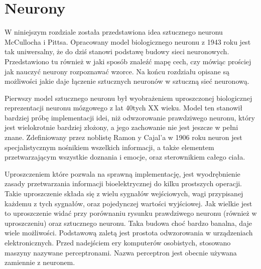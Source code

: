 \documentclass[12pt,a4paper,twoside,titlepage,openright]{book}
\begin{document}
\chapter{Neurony}
W niniejszym rozdziale została przedstawiona idea sztucznego neuronu McCullocha i Pittsa. Opracowany model biologicznego neuronu z 1943 roku jest tak uniwersalny, że do dziś stanowi podstawę budowy sieci neuronowych. Przedstawiono tu również w jaki sposób znaleźć mapę cech, czy mówiąc prościej jak nauczyć neurony rozpoznawać wzorce. Na końcu rozdziału opisane są możliwości jakie daje łączenie sztucznych neuronów w sztuczną sieć neuronową.

Pierwszy model sztucznego neuronu był wyobrażeniem uproszczonej biologicznej reprezentacji neuronu mózgowego z lat 40tych XX wieku. Model ten stanowił bardziej próbę implementacji idei, niż odwzorowanie prawdziwego neuronu, który jest wielokrotnie bardziej złożony, a jego zachowanie nie jest jeszcze w pełni znane. Zdefiniowany przez noblistę Ramon y Cajal'a w 1906 roku neuron jest specjalistycznym nośnikiem wszelkich informacji, a także elementem przetwarzającym wszystkie doznania i emocje, oraz sterownikiem całego ciała.

Uproszczeniem które pozwala na sprawną implementację, jest wyodrębnienie zasady przetwarzania informacji bioelektrycznej do kilku prostszych operacji. Takie uproszczenie składa się z wielu sygnałów wejściowych, wagi przypisanej każdemu z tych sygnałów, oraz pojedynczej wartości wyjściowej. Jak wielkie jest to uproszczenie widać przy porównaniu rysunku prawdziwego neuronu (również w uproszczeniu) oraz sztucznego neuronu. Taka budowa choć bardzo banalna, daje wiele możliwości. Podstawową zaletą jest prostota odwzorowania w urządzeniach elektronicznych. Przed nadejściem ery komputerów osobistych, stosowano maszyny nazywane perceptronami. Nazwa perceptron jest obecnie używana zamiennie z neuronem.\cite{odkrywanieSieci}
\end{document}
